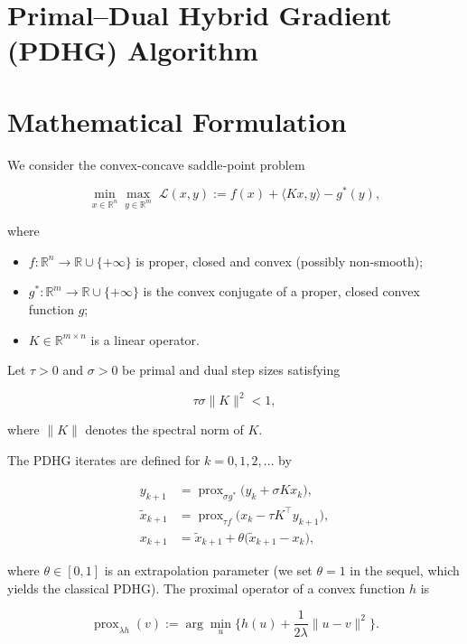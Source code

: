 \documentclass{article}
\newcommand{\prox}{\operatorname{prox}}
\begin{document}
\section*{Primal–Dual Hybrid Gradient (PDHG) Algorithm}

\section*{Mathematical Formulation}
We consider the convex-concave saddle‑point problem  

\[
\min_{x\in\mathbb R^{n}}\max_{y\in\mathbb R^{m}}
\; \mathcal L(x,y):= f(x)+\langle Kx , y\rangle - g^{*}(y),
\tag{1}
\]

where  

\begin{itemize}
  \item $f:\mathbb R^{n}\to\mathbb R\cup\{+\infty\}$ is proper, closed and convex (possibly non‑smooth);
  \item $g^{*}:\mathbb R^{m}\to\mathbb R\cup\{+\infty\}$ is the convex conjugate of a proper, closed convex function $g$;
  \item $K\in\mathbb R^{m\times n}$ is a linear operator.
\end{itemize}

Let $\tau>0$ and $\sigma>0$ be primal and dual step sizes satisfying  

\[
\tau\sigma\|K\|^{2}<1,
\tag{2}
\]

where $\|K\|$ denotes the spectral norm of $K$.

The PDHG iterates are defined for $k=0,1,2,\dots$ by  

\[
\boxed{
\begin{aligned}
y_{k+1}      &= \prox_{\sigma g^{*}}\!\bigl( y_{k}+ \sigma Kx_{k}\bigr), \tag{3a}\\[4pt]
\tilde x_{k+1}&= \prox_{\tau f}\!\bigl( x_{k}-\tau K^{\top} y_{k+1}\bigr), \tag{3b}\\[4pt]
x_{k+1}      &= \tilde x_{k+1}+ \theta\bigl(\tilde x_{k+1}-x_{k}\bigr), \tag{3c}
\end{aligned}}
\]

where $\theta\in[0,1]$ is an extrapolation parameter (we set $\theta=1$ in the sequel, which yields the classical PDHG).  
The proximal operator of a convex function $h$ is  

\[
\prox_{\lambda h}(v):=\arg\min_{u}\Big\{ h(u)+\frac{1}{2\lambda}\|u-v\|^{2}\Big\}.
\]
\end{document}
